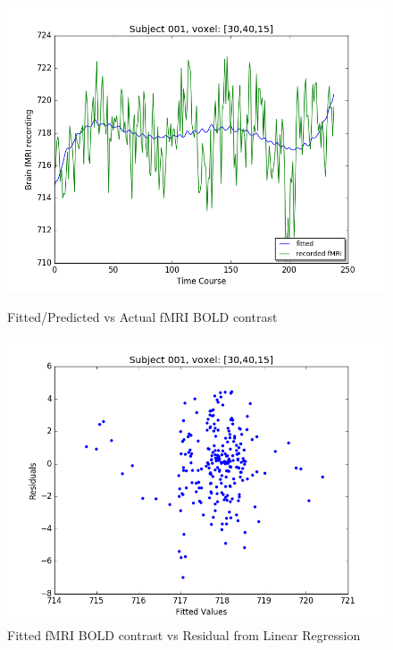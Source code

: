 \begin{figure}[ht]
\centering
\begin{minipage}[b]{0.45\linewidth}
	\centering
	\includegraphics[width=.8\linewidth]{../images/Fitted_v_Actual.png} 
	\caption{Fitted/Predicted vs Actual fMRI BOLD contrast}
	\label{fig:fit_vs_act}
\end{minipage}	
\quad
\begin{minipage}[b]{0.45\linewidth}
	\centering
		\includegraphics[width=.8\linewidth]{../images/Fitted_v_Residuals.png} 
	\caption{Fitted fMRI BOLD contrast vs Residual from Linear Regression}
	\label{fig:fit_vs_res}
\end{minipage}
\end{figure}





